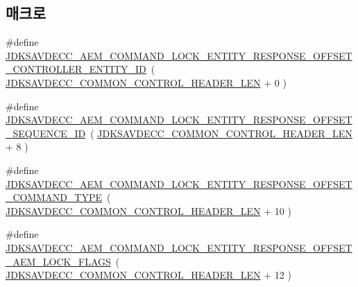 \subsection*{매크로}
\begin{DoxyCompactItemize}
\item 
\#define \hyperlink{group__command__lock__entity__response_gae759a0bde56c5a95069aedde584d8a22}{J\+D\+K\+S\+A\+V\+D\+E\+C\+C\+\_\+\+A\+E\+M\+\_\+\+C\+O\+M\+M\+A\+N\+D\+\_\+\+L\+O\+C\+K\+\_\+\+E\+N\+T\+I\+T\+Y\+\_\+\+R\+E\+S\+P\+O\+N\+S\+E\+\_\+\+O\+F\+F\+S\+E\+T\+\_\+\+C\+O\+N\+T\+R\+O\+L\+L\+E\+R\+\_\+\+E\+N\+T\+I\+T\+Y\+\_\+\+ID}~( \hyperlink{group__jdksavdecc__avtp__common__control__header_gaae84052886fb1bb42f3bc5f85b741dff}{J\+D\+K\+S\+A\+V\+D\+E\+C\+C\+\_\+\+C\+O\+M\+M\+O\+N\+\_\+\+C\+O\+N\+T\+R\+O\+L\+\_\+\+H\+E\+A\+D\+E\+R\+\_\+\+L\+EN} + 0 )
\item 
\#define \hyperlink{group__command__lock__entity__response_ga58732dc145c2da4e1f2624e98af212c6}{J\+D\+K\+S\+A\+V\+D\+E\+C\+C\+\_\+\+A\+E\+M\+\_\+\+C\+O\+M\+M\+A\+N\+D\+\_\+\+L\+O\+C\+K\+\_\+\+E\+N\+T\+I\+T\+Y\+\_\+\+R\+E\+S\+P\+O\+N\+S\+E\+\_\+\+O\+F\+F\+S\+E\+T\+\_\+\+S\+E\+Q\+U\+E\+N\+C\+E\+\_\+\+ID}~( \hyperlink{group__jdksavdecc__avtp__common__control__header_gaae84052886fb1bb42f3bc5f85b741dff}{J\+D\+K\+S\+A\+V\+D\+E\+C\+C\+\_\+\+C\+O\+M\+M\+O\+N\+\_\+\+C\+O\+N\+T\+R\+O\+L\+\_\+\+H\+E\+A\+D\+E\+R\+\_\+\+L\+EN} + 8 )
\item 
\#define \hyperlink{group__command__lock__entity__response_ga04af292f64c72cbf6139f368b929669f}{J\+D\+K\+S\+A\+V\+D\+E\+C\+C\+\_\+\+A\+E\+M\+\_\+\+C\+O\+M\+M\+A\+N\+D\+\_\+\+L\+O\+C\+K\+\_\+\+E\+N\+T\+I\+T\+Y\+\_\+\+R\+E\+S\+P\+O\+N\+S\+E\+\_\+\+O\+F\+F\+S\+E\+T\+\_\+\+C\+O\+M\+M\+A\+N\+D\+\_\+\+T\+Y\+PE}~( \hyperlink{group__jdksavdecc__avtp__common__control__header_gaae84052886fb1bb42f3bc5f85b741dff}{J\+D\+K\+S\+A\+V\+D\+E\+C\+C\+\_\+\+C\+O\+M\+M\+O\+N\+\_\+\+C\+O\+N\+T\+R\+O\+L\+\_\+\+H\+E\+A\+D\+E\+R\+\_\+\+L\+EN} + 10 )
\item 
\#define \hyperlink{group__command__lock__entity__response_ga0915b908bcbb2a05161155e71198039e}{J\+D\+K\+S\+A\+V\+D\+E\+C\+C\+\_\+\+A\+E\+M\+\_\+\+C\+O\+M\+M\+A\+N\+D\+\_\+\+L\+O\+C\+K\+\_\+\+E\+N\+T\+I\+T\+Y\+\_\+\+R\+E\+S\+P\+O\+N\+S\+E\+\_\+\+O\+F\+F\+S\+E\+T\+\_\+\+A\+E\+M\+\_\+\+L\+O\+C\+K\+\_\+\+F\+L\+A\+GS}~( \hyperlink{group__jdksavdecc__avtp__common__control__header_gaae84052886fb1bb42f3bc5f85b741dff}{J\+D\+K\+S\+A\+V\+D\+E\+C\+C\+\_\+\+C\+O\+M\+M\+O\+N\+\_\+\+C\+O\+N\+T\+R\+O\+L\+\_\+\+H\+E\+A\+D\+E\+R\+\_\+\+L\+EN} + 12 )
\item 

\end{DoxyCompactItemize}
